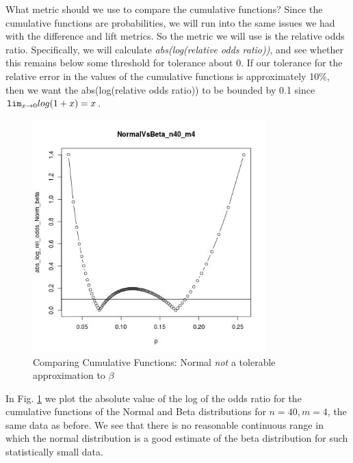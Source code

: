 \documentclass[12pt]{report}
\begin{document}
What metric should we use to compare the cumulative functions?
Since the cumulative functions
are probabilities, we will run into the same issues we had with the
difference and lift metrics.  So the metric we will use is the relative odds
ratio.  Specifically, we will calculate {\it abs(log(relative odds ratio))},
and see whether this
remains below some threshold for tolerance about 0. If our tolerance for the
relative error
in the values of the cumulative functions
is approximately 10\%, then we want the abs(log(relative odds ratio)) to be
bounded by 0.1 since \({\tt lim}_{x\rightarrow 0}log(1+x)=x\).
\begin{figure}[ht!]
\centering
\includegraphics[width=90mm]{NormalVsBeta_n40_m4}
\caption{Comparing Cumulative Functions: Normal {\em not} a tolerable
approximation to \(\beta\) \label{fig:NormalVsBeta_40_4}}
\end{figure}
In Fig. \ref{fig:NormalVsBeta_40_4} we plot the absolute value of the log
of the odds ratio for the cumulative functions of the Normal and Beta
distributions for \(n=40, m=4\), the same data as before. We see that there is
no reasonable continuous range in which the normal distribution is a
good estimate of the beta distribution for such statistically small data.
\end{document}

